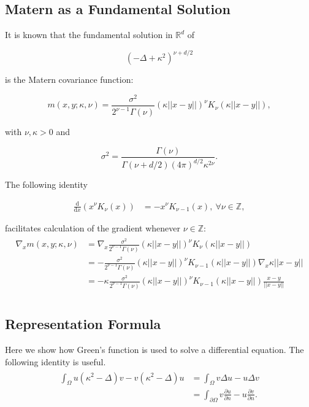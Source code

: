 \documentclass[paper=a4, fontsize=11pt]{scrartcl} %
\numberwithin{equation}{section} %
\numberwithin{figure}{section} %
\numberwithin{table}{section} %
\begin{document}
\subsection{Matern as a Fundamental Solution}
It is known \cite{lindgren2011explicit} that the fundamental solution in $\mathbb{R}^d$ of

$$
(-\Delta + \kappa^2)^{ \nu + d/2 }
$$

is the Matern covariance function:

$$
m(x,y; \kappa, \nu ) = \frac{\sigma^2}{2^{\nu-1}\Gamma(\nu)} (\kappa||x-y||)^{\nu} K_{\nu}( \kappa||x-y||), 
$$

with $\nu, \kappa > 0$ and

$$
\sigma^2 = \frac{\Gamma(\nu)}{\Gamma(\nu + d/2) (4\pi)^{d/2} \kappa^{2\nu}}.
$$

The following identity

\begin{align}\label{diff}
  \frac{\text{d}}{\text{d}x} (x^{\nu} K_{\nu}(x)) &= -x^{\nu}K_{\nu-1}(x), \ \forall \nu \in \mathbb{Z},
\end{align}

facilitates calculation of the gradient whenever $\nu \in \mathbb{Z}$:
\begin{align}\label{grad_matern}
  \begin{split}
  \nabla_{x} m( x,y; \kappa, \nu ) &= \nabla_{x} \frac{\sigma^2}{2^{\nu-1}\Gamma(\nu)} (\kappa||x-y||)^{\nu}K_{\nu}(\kappa||x-y||) \\
  &= -\frac{\sigma^2}{2^{\nu-1}\Gamma(\nu)} (\kappa||x-y||)^{\nu}K_{\nu-1}(\kappa||x-y||) \nabla_{x} \kappa||x-y|| \\
  &= -\kappa\frac{\sigma^2}{2^{\nu-1}\Gamma(\nu)} (\kappa||x-y||)^{\nu}K_{\nu-1}(\kappa||x-y||) \frac{x-y}{||x-y||} \\
  \end{split}
\end{align}



\subsection{Representation Formula}

Here we show how Green's function is used to solve a differential equation. The following identity
is useful.
\begin{align}\label{modified green}
  \begin{split}
    \int_{\Omega} u( \kappa^2 - \Delta) v - v( \kappa^2 - \Delta) u &= \int_{\Omega} v\Delta u - u\Delta v\\
    &= \int_{\partial \Omega } v\frac{\partial u}{\partial n} - u \frac{\partial v}{\partial n}.\\
  \end{split}
\end{align}
\end{document}
